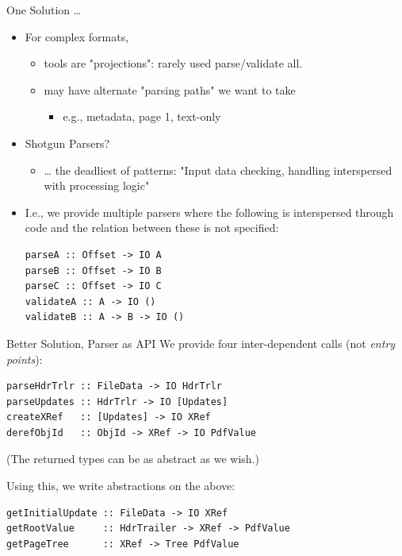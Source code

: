 \documentclass[t,10pt,xcolor={dvipsnames}]{beamer}
\begin{document}
\begin{frame}[label={sec:org5300fab},fragile]{One Solution \ldots{}}
 \begin{itemize}
\item For complex formats,
\begin{itemize}
\item tools are "projections": rarely used parse/validate all.
\item may have alternate "parsing paths" we want to take
\begin{itemize}
\item e.g., metadata, page 1, text-only
\end{itemize}
\end{itemize}

\item Shotgun Parsers?
\begin{itemize}
\item \ldots{} the deadliest of patterns: "Input data checking, handling interspersed
with processing logic"
\end{itemize}

\item I.e., we provide multiple parsers where the following is interspersed through
code and the relation between these is \alert{not specified}:
\lstset{language=haskell,label= ,caption= ,captionpos=b,numbers=none}
\begin{lstlisting}
parseA :: Offset -> IO A
parseB :: Offset -> IO B
parseC :: Offset -> IO C
validateA :: A -> IO ()
validateB :: A -> B -> IO ()
\end{lstlisting}
\end{itemize}
\end{frame}

\begin{frame}[label={sec:org88ea615},fragile]{Better Solution, Parser as API}
 We provide four inter-dependent calls (not \emph{entry points}):
\lstset{language=haskell,label= ,caption= ,captionpos=b,numbers=none}
\begin{lstlisting}
parseHdrTrlr :: FileData -> IO HdrTrlr
parseUpdates :: HdrTrlr -> IO [Updates]
createXRef   :: [Updates] -> IO XRef
derefObjId   :: ObjId -> XRef -> IO PdfValue
\end{lstlisting}
(The returned types can be as abstract as we wish.)

\vspace{18pt}

Using this, we write abstractions on the above:
\lstset{language=haskell,label= ,caption= ,captionpos=b,numbers=none}
\begin{lstlisting}
getInitialUpdate :: FileData -> IO XRef
getRootValue     :: HdrTrailer -> XRef -> PdfValue
getPageTree      :: XRef -> Tree PdfValue
\end{lstlisting}
\end{frame}
\end{document}
